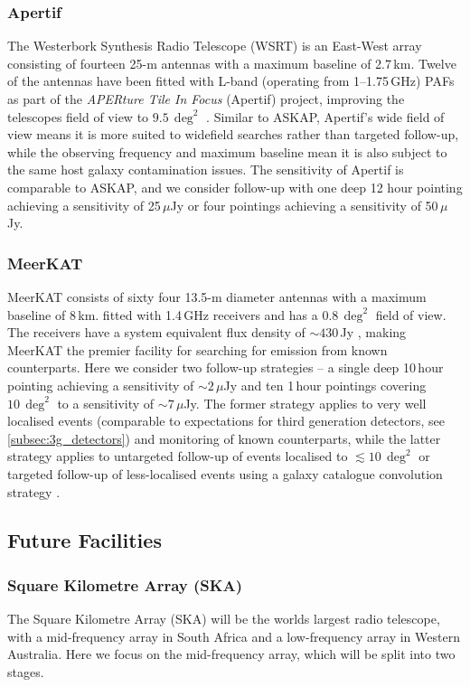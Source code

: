 \subsubsection{Apertif}
The Westerbork Synthesis Radio Telescope (WSRT) is an East-West array consisting of fourteen 25-m antennas with a maximum baseline of 2.7\,km. Twelve of the antennas have been fitted with L-band (operating from 1--1.75\,GHz) PAFs as part of the \textit{APERture Tile In Focus} (Apertif) project, improving the telescopes field of view to $9.5\,\deg^2$ \citep{2010iska.meetE..43O,2019NatAs...3..188A}. Similar to ASKAP, Apertif's wide field of view means it is more suited to widefield searches rather than targeted follow-up, while the observing frequency and maximum baseline mean it is also subject to the same host galaxy contamination issues. The sensitivity of Apertif is comparable to ASKAP, and we consider follow-up with one deep 12 hour pointing achieving a sensitivity of 25\,$\mu$Jy or four pointings achieving a sensitivity of 50\,$\mu$Jy.

\subsubsection{MeerKAT}
MeerKAT \citep{2016mks..confE...1J} consists of sixty four 13.5-m diameter antennas with a maximum baseline of 8\,km. fitted with 1.4\,GHz receivers and has a $0.8\,\deg^2$ field of view. The receivers have a system equivalent flux density of $\sim 430\,$Jy \citep{2020ApJ...888...61M}, making MeerKAT the premier facility for searching for emission from known counterparts. Here we consider two follow-up strategies -- a single deep 10\,hour pointing achieving a sensitivity of $\sim 2\,\mu$Jy and ten 1\,hour pointings covering $10\,\deg^2$ to a sensitivity of $\sim 7\,\mu$Jy. The former strategy applies to very well localised events (comparable to expectations for third generation detectors, see \ref{subsec:3g_detectors}) and monitoring of known counterparts, while the latter strategy applies to untargeted follow-up of events localised to $\lesssim 10\,\deg^2$ or targeted follow-up of less-localised events using a galaxy catalogue convolution strategy \citep{2016MNRAS.462.1591E}.



\subsection{Future Facilities}
\label{subsec:future_facilities}
\subsubsection{Square Kilometre Array (SKA)}
The Square Kilometre Array (SKA) will be the worlds largest radio telescope, with a mid-frequency array in South Africa and a low-frequency array in Western Australia. Here we focus on the mid-frequency array, which will be split into two stages.

